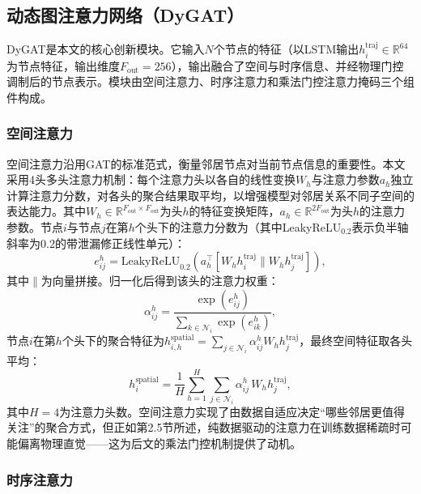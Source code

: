 \documentclass[12pt,a4paper,UTF8]{ctexart}
\begin{document}
\subsection{动态图注意力网络（DyGAT）}

DyGAT是本文的核心创新模块。它输入$N$个节点的特征（以LSTM输出$h_i^{\text{traj}}\in\mathbb{R}^{64}$为节点特征，输出维度$F_{\text{out}}=256$），输出融合了空间与时序信息、并经物理门控调制后的节点表示。模块由空间注意力、时序注意力和乘法门控注意力掩码三个组件构成。

\subsubsection{空间注意力}

空间注意力沿用GAT的标准范式，衡量邻居节点对当前节点信息的重要性。本文采用4头多头注意力机制：每个注意力头以各自的线性变换$W_h$与注意力参数$a_h$独立计算注意力分数，对各头的聚合结果取平均，以增强模型对邻居关系不同子空间的表达能力。其中$W_h\in\mathbb{R}^{F_{\text{out}}\times F_{\text{out}}}$为头$h$的特征变换矩阵，$a_h\in\mathbb{R}^{2F_{\text{out}}}$为头$h$的注意力参数。节点$i$与节点$j$在第$h$个头下的注意力分数为（其中LeakyReLU$_{0.2}$表示负半轴斜率为0.2的带泄漏修正线性单元）：
\begin{equation}
    e_{ij}^{h} = \text{LeakyReLU}_{0.2}\!\left(a_h^{\top}[W_h h_i^{\text{traj}} \parallel W_h h_j^{\text{traj}}]\right),
    \label{eq:spatial_score}
\end{equation}
其中$\parallel$为向量拼接。归一化后得到该头的注意力权重：
\begin{equation}
    \alpha_{ij}^{h} = \frac{\exp(e_{ij}^{h})}{\sum_{k\in\mathcal{N}_i}\exp(e_{ik}^{h})},
    \label{eq:spatial_softmax}
\end{equation}
节点$i$在第$h$个头下的聚合特征为$h_{i,h}^{\text{spatial}} = \sum_{j\in\mathcal{N}_i}\alpha_{ij}^{h} W_h h_j^{\text{traj}}$，最终空间特征取各头平均：
\begin{equation}
    h_i^{\text{spatial}} = \frac{1}{H}\sum_{h=1}^{H} \sum_{j\in\mathcal{N}_i}\alpha_{ij}^{h}\, W_h h_j^{\text{traj}},
    \label{eq:spatial_agg}
\end{equation}
其中$H=4$为注意力头数。空间注意力实现了由数据自适应决定“哪些邻居更值得关注”的聚合方式，但正如第2.5节所述，纯数据驱动的注意力在训练数据稀疏时可能偏离物理直觉——这为后文的乘法门控机制提供了动机。

\subsubsection{时序注意力}
\end{document}
